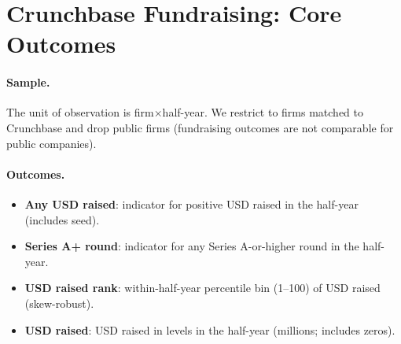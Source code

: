 \documentclass{article}
\newcommand{\cleanedresultsdir}{../results/cleaned/tex}
\begin{document}
\thispagestyle{empty}

\section*{Crunchbase Fundraising: Core Outcomes}

\paragraph{Sample.}
The unit of observation is firm$\times$half-year. We restrict to firms matched to Crunchbase and drop public firms
(fundraising outcomes are not comparable for public companies).

\paragraph{Outcomes.}
\begin{itemize}
  \item \textbf{Any USD raised}: indicator for positive USD raised in the half-year (includes seed).
  \item \textbf{Series A+ round}: indicator for any Series A-or-higher round in the half-year.
  \item \textbf{USD raised rank}: within-half-year percentile bin (1--100) of USD raised (skew-robust).
  \item \textbf{USD raised}: USD raised in levels in the half-year (millions; includes zeros).
\end{itemize}

\begin{table}[H]
\caption{\textbf{Crunchbase Fundraising Outcomes (Core 4)}}

\end{table}
\end{document}
